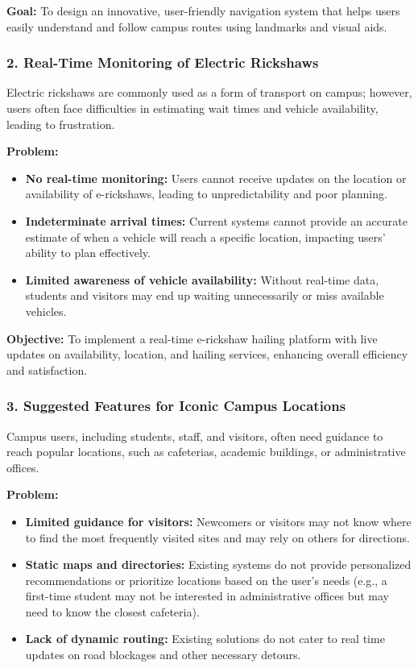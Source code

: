 \textbf{Goal:} To design an innovative, user-friendly navigation system that helps users easily understand and follow campus routes using landmarks and visual aids.

\subsubsection*{2. Real-Time Monitoring of Electric Rickshaws}
Electric rickshaws are commonly used as a form of transport on campus; however, users often face difficulties in estimating wait times and vehicle availability, leading to frustration.

\textbf{Problem:}
\begin{itemize}
	\item \textbf{No real-time monitoring:} Users cannot receive updates on the location or availability of e-rickshaws, leading to unpredictability and poor planning.
	\item \textbf{Indeterminate arrival times:} Current systems cannot provide an accurate estimate of when a vehicle will reach a specific location, impacting users' ability to plan effectively.
	\item \textbf{Limited awareness of vehicle availability:} Without real-time data, students and visitors may end up waiting unnecessarily or miss available vehicles.
\end{itemize}

\textbf{Objective:} To implement a real-time e-rickshaw hailing platform with live updates on availability, location, and hailing services, enhancing overall efficiency and satisfaction.

\subsubsection*{3. Suggested Features for Iconic Campus Locations}
Campus users, including students, staff, and visitors, often need guidance to reach popular locations, such as cafeterias, academic buildings, or administrative offices.

\textbf{Problem:}
\begin{itemize}
	\item \textbf{Limited guidance for visitors:} Newcomers or visitors may not know where to find the most frequently visited sites and may rely on others for directions.
	\item \textbf{Static maps and directories:} Existing systems do not provide personalized recommendations or prioritize locations based on the user’s needs (e.g., a first-time student may not be interested in administrative offices but may need to know the closest cafeteria).
	\item \textbf{Lack of dynamic routing:} Existing solutions do not cater to real time updates on road blockages and other necessary detours.
\end{itemize}

